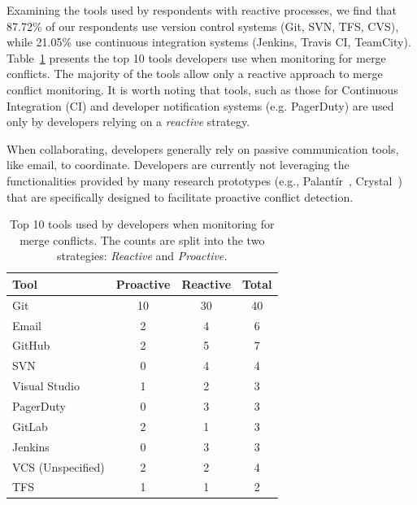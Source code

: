 
Examining the tools used by respondents with reactive processes, we find that 87.72\% of our respondents use version control systems (Git, SVN, TFS, CVS), while 21.05\% use continuous integration systems (Jenkins, Travis CI, TeamCity).
Table~\ref{tab:tool-counts} presents the top 10 tools developers use when monitoring for merge conflicts.
The majority of the tools allow only a reactive approach to merge conflict monitoring.
It is worth noting that tools, such as those for Continuous Integration (CI) and developer notification systems (e.g. PagerDuty) are used only by developers relying on a \emph{reactive} strategy.

When collaborating, developers generally rely on passive communication tools, like email, to coordinate.
Developers are currently not leveraging the functionalities provided by many research prototypes (e.g., Palant\'{i}r~\cite{palantir}, Crystal~\cite{Brun2011}) that are specifically designed to facilitate proactive conflict detection.

\begin{table}[hbt]
\caption{Top 10 tools used by developers when monitoring for merge conflicts. The counts are split into the two strategies: \emph{Reactive} and \emph{Proactive.}}
\label{tab:tool-counts}
\centering
\begin{tabular}{lccc}
\toprule
Tool & Proactive & Reactive & Total \\
\midrule
Git					& 10 & 30 & 40 \\
Email				& 2  & 4  & 6  \\
GitHub				& 2  & 5  & 7  \\
SVN					& 0  & 4  & 4  \\
Visual Studio		& 1  & 2  & 3  \\
PagerDuty 		    & 0  & 3  & 3  \\
GitLab				& 2  & 1  & 3  \\
Jenkins				& 0  & 3  & 3  \\
VCS (Unspecified)	& 2  & 2  & 4  \\
TFS					& 1  & 1  & 2  \\
\bottomrule
\end{tabular}	

\end{table}

